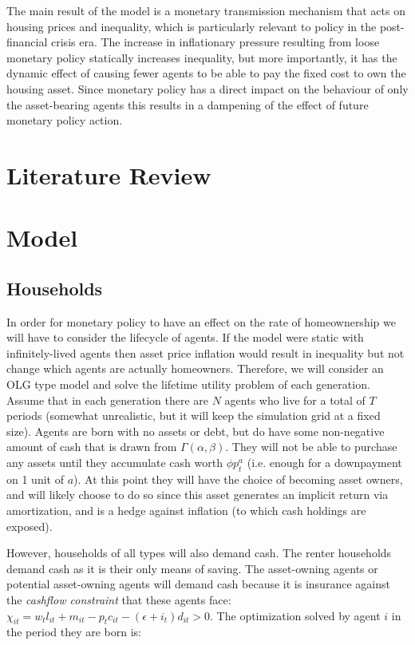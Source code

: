 \documentclass{article}
\begin{document}
The main result of the model is a monetary transmission mechanism that acts on housing prices and inequality, which is particularly relevant to policy in the post-financial crisis era. The increase in inflationary pressure resulting from loose monetary policy statically increases inequality, but more importantly, it has the dynamic effect of causing fewer agents to be able to pay the fixed cost to own the housing asset. Since monetary policy has a direct impact on the behaviour of only the asset-bearing agents this results in a dampening of the effect of future monetary policy action.

\section{Literature Review} \label{lit_review}

\section{Model} \label{model}

\subsection{Households} \label{households}

In order for monetary policy to have an effect on the rate of homeownership we will have to consider the lifecycle of agents. If the model were static with infinitely-lived agents then asset price inflation would result in inequality but not change which agents are actually homeowners. Therefore, we will consider an OLG type model and solve the lifetime utility problem of each generation. Assume that in each generation there are $N$ agents who live for a total of $T$ periods (somewhat unrealistic, but it will keep the simulation grid at a fixed size). Agents are born with no assets or debt, but do have some non-negative amount of cash that is drawn from $\Gamma (\alpha, \beta)$. They will not be able to purchase any assets until they accumulate cash worth $\phi p^a_t$ (i.e. enough for a downpayment on 1 unit of $a$). At this point they will have the choice of becoming asset owners, and will likely choose to do so since this asset generates an implicit return via amortization, and is a hedge against inflation (to which cash holdings are exposed). 

However, households of all types will also demand cash. The renter households demand cash as it is their only means of saving. The asset-owning agents or potential asset-owning agents will demand cash because it is insurance against the \textit{cashflow constraint} that these agents face: $\chi_{it} = w_t l_{it} + m_{it} - p_t c_{it} - (\epsilon + i_t) d_{it} > 0$. The optimization solved by agent $i$ in the period they are born is:
\end{document}
